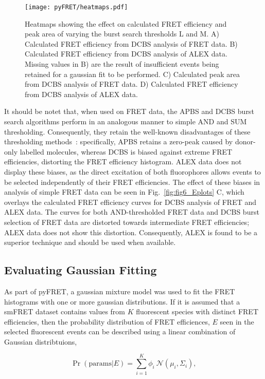 \begin{figure}[!ht]
   \begin{center}
      \texttt{[image: pyFRET/heatmaps.pdf]}
      \caption{Heatmaps showing the effect on calculated FRET efficiency and peak area of varying the burst search thresholds L and M. A) Calculated FRET efficiency from DCBS analysis of FRET data. B) Calculated FRET efficiency from DCBS analysis of ALEX data. Missing values in B) are the result of insufficient events being retained for a gaussian fit to be performed. C) Calculated peak area from DCBS analysis of FRET data. D) Calculated FRET efficiency from DCBS analysis of ALEX data.}
      \label{fig:fig8_heatmaps}
   \end{center}
\end{figure}

It should be notet that, when used on FRET data, the APBS and DCBS burst search algorithms perform in an analogous manner to simple AND and SUM thresholding. Consequently, they retain the well-known disadvantages of these thresholding methods~\cite{murphy14}: specifically, APBS retains a zero-peak caused by donor-only labelled molecules, whereas DCBS is biased against extreme FRET efficiencies, distorting the FRET efficiency histogram. ALEX data does not display these biases, as the direct excitation of both fluorophores allows events to be selected independently of their FRET efficiencies. The effect of these biases in analysis of simple FRET data can be seen in Fig.~\ref{fig:fig6_Eplots} C, which overlays the calculated FRET efficiency curves for DCBS analysis of FRET and ALEX data. The curves for both AND-thresholded FRET data and DCBS burst selection of FRET data are distorted towards intermediate FRET efficiencies; ALEX data does not show this distortion. Consequently, ALEX is found to be a superior technique and should be used when available.

\subsection{Evaluating Gaussian Fitting}
As part of pyFRET, a gaussian mixture model was used to fit the FRET histograms with one or more gaussian distributions. If it is assumed that a smFRET dataset contains values from $K$ fluorescent species with distinct FRET efficiencies, then the probability distribution of FRET efficiences, $E$ seen in the selected fluorescent events can be described using a linear combination of Gaussian distribtuions, 

\begin{equation}
\Pr(\text{params}|E) = \sum_{i=1}^K \phi_i~\mathcal{N}(\mu_i, \Sigma_i),
\label{eq:gmm}
\end{equation}

